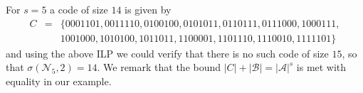 \documentclass[11pt]{article}
\newcommand{\cA}{\mathcal{A}}
\newcommand{\cN}{\mathcal{N}}
\begin{document}
For $s=5$ a code of size $14$ is given by 
\begin{eqnarray*}
  C &=& \{0001101,0011110, 0100100, 0101011, 0110111, 0111000, 1000111, \\ 
    & & 1001000, 1010100, 1011011, 1100001, 1101110,1110010, 1111101\}
\end{eqnarray*} 
and using the above ILP we could verify that there is no such code of size $15$, so that $\sigma(\cN_5,2)=14$. We remark that the bound $|C|+|\mathcal{B}|=|\cA|^s$ is met with equality in our example. 
\end{document}
